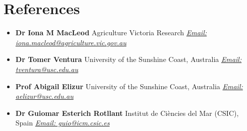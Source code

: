\documentclass[letterpaper,11pt]{article}
\newcommand{\resumeRef}[2]{
  \item\small{
    \textbf{#1} {#2}}
  }
\newcommand{\resumeItemListStart}{\begin{itemize}}
\newcommand{\resumeItemListEnd}{\end{itemize}}
\begin{document}
\section{References}
 \resumeItemListStart
    \resumeRef{Dr Iona M MacLeod}  {Agriculture Victoria Research} \href{mailto:iona.mcleod@agriculture.vic.gov.au}{\textit{Email: iona.macleod@agriculture.vic.gov.au}}
    \resumeRef{Dr Tomer Ventura}  {University of the Sunshine Coast, Australia} \href{mailto:tventura@usc.edu.au}{\textit{Email: tventura@usc.edu.au}} 
    \resumeRef{Prof Abigail Elizur}  {University of the Sunshine Coast, Australia} \href{mailto:aelizur@usc.edu.au}{\textit{Email: aelizur@usc.edu.au}} 
    \resumeRef{Dr Guiomar Esterich Rotllant}  {Institut de Ciències del Mar (CSIC), Spain} \href{mailto:guio@icm.csic.es}{\textit{Email: guio@icm.csic.es}} 
  \resumeItemListEnd
  
\end{document}
